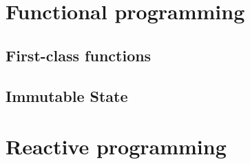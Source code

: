 \section{Functional programming}

\subsection{First-class functions}
\subsection{Immutable State}

\section{Reactive programming}

